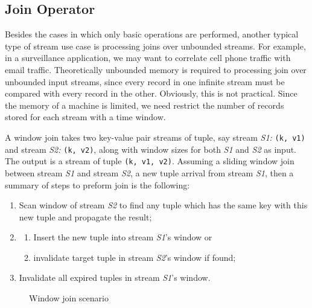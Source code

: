 \subsection{Join Operator}
 \label{sub:join_operator}

Besides the cases in which only basic operations are performed, another typical type of stream use case is processing joins over unbounded streams. For example, in a surveillance application, we may want to correlate cell phone traffic with email traffic. Theoretically unbounded memory is required to processing join over unbounded input streams, since every record in one infinite stream must be compared with every record in the other. Obviously, this is not practical.\cite{window-join} Since the memory of a machine is limited, we need restrict the number of records stored for each stream with a time window. 

A window join takes two key-value pair streams of tuple, say stream \textit{S1:} \texttt{(k, v1)} and stream \textit{S2:} \texttt{(k, v2)}, along with window sizes for both \textit{S1} and \textit{S2} as input. The output is a stream of tuple \texttt{(k, v1, v2)}. Assuming a sliding window join between stream \textit{S1} and stream \textit{S2}, a new tuple arrival from stream \textit{S1}, then a summary of steps to preform join is the following:

\begin{enumerate}
\item Scan window of stream \textit{S2} to find any tuple which has the same key with this new tuple and propagate the result;
\item 
\begin{enumerate}
\item Insert the new tuple into stream \textit{S1}'s window or
\item  invalidate target tuple in stream \textit{S2}'s window if found;
\end{enumerate}
\item Invalidate all expired tuples in stream \textit{S1}'s window.
\end{enumerate}

\begin{figure}
  \begin{center}
   \caption{Window join scenario}
   \label{fig:window_join}
  \end{center}
\end{figure}

